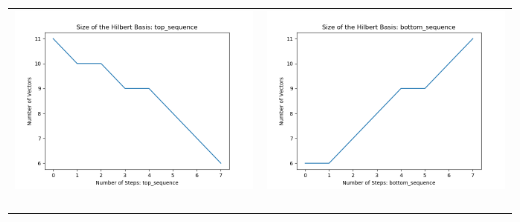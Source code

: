 \documentclass[10pt]{article}
\begin{document}
\begin{tabular}{c|c}
\begin{minipage}{.45\textwidth}
\includegraphics[width=\textwidth]{"DATA/4d/4 generators 2 bound E/top_sequence SIZE"}
\end{minipage} &
\begin{minipage}{.45\textwidth}
\includegraphics[width=\textwidth]{"DATA/4d/4 generators 2 bound E bottomup/bottom_sequence SIZE"}
\end{minipage} \\ \\
\hline \\\begin{minipage}{.45\textwidth}

\end{minipage}
\end{tabular}
\end{document}
